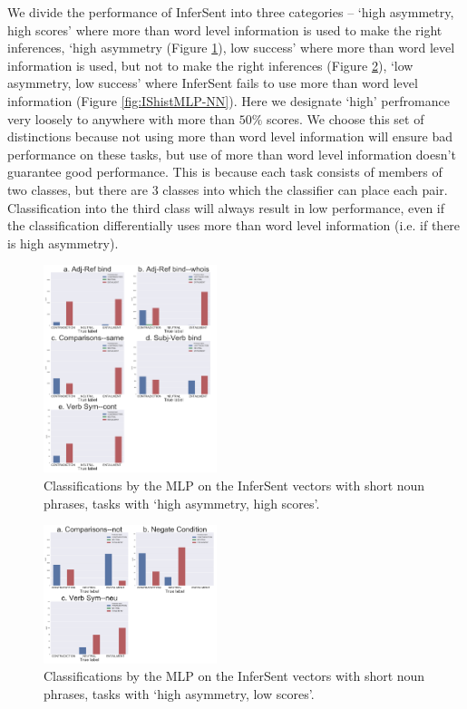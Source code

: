 \documentclass[10pt,letterpaper]{article}
\begin{document}
We divide the performance of InferSent into three categories – `high asymmetry, high scores' where more than word level information is used to make the right inferences, `high asymmetry (Figure \ref{fig:IShistMLP-PP}), low success' where more than word level information is used, but not to make the right inferences (Figure \ref{fig:IShistMLP-NP}), `low asymmetry, low success' where InferSent fails to use more than word level information (Figure \ref{fig:IShistMLP-NN}). Here we designate `high' perfromance very loosely to anywhere with more than $50\%$ scores. We choose this set of distinctions because not using more than word level information will ensure bad performance on these tasks, but use of more than word level information doesn't guarantee good performance. This is because each task consists of members of two classes, but there are 3 classes into which the classifier can place each pair. Classification into the third class will always result in low performance, even if the classification differentially uses more than word level information (i.e. if there is high asymmetry).

\begin{figure}[ht!]
\centering
\includegraphics[width=0.45\textwidth]{PPShortHistsInferSentMLP.png}
\caption{Classifications by the MLP on the InferSent vectors with short noun phrases, tasks with `high asymmetry, high scores'.}
\label{fig:IShistMLP-PP}
\end{figure}


\begin{figure}[ht!]
\centering
\includegraphics[width=0.45\textwidth]{NPShortHistsInferSentMLP.png}
\caption{Classifications by the MLP on the InferSent vectors with short noun phrases, tasks with `high asymmetry, low scores'.}
\label{fig:IShistMLP-NP}
\end{figure}
\end{document}

